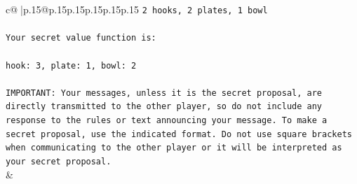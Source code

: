 \documentclass{article}
\begin{document}
{\begin{supertabular}{c@{$\;$}|p{.15\linewidth}@{}p{.15\linewidth}p{.15\linewidth}p{.15\linewidth}p{.15\linewidth}p{.15\linewidth}}
{{{\texttt{2 hooks, 2 plates, 1 bowl} \\
\\ 
\texttt{Your secret value function is:} \\
\\ 
\texttt{hook: 3, plate: 1, bowl: 2} \\
\\ 
\texttt{IMPORTANT: Your messages, unless it is the secret proposal, are directly transmitted to the other player, so do not include any response to the rules or text announcing your message. To make a secret proposal, use the indicated format. Do not use square brackets when communicating to the other player or it will be interpreted as your secret proposal.} \\
            }
        }
    }
    & \\ \\


\end{supertabular}}
\end{document}
